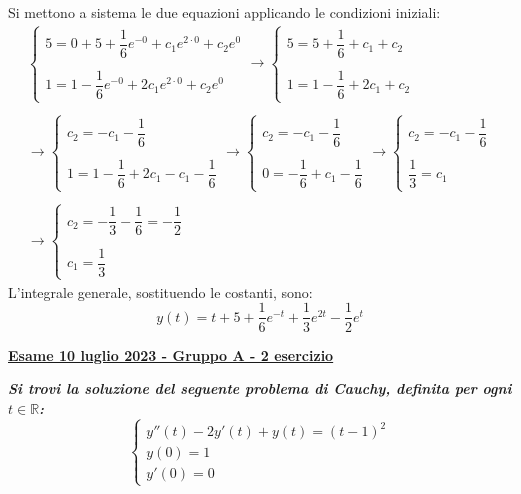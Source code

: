 \documentclass[a4paper]{article}
\newcommand{\definition}[1]{\textcolor{Red3}{\textbf{#1}}}
\newcommand{\example}[1]{\textcolor{Green4}{\textbf{#1}}}
\begin{document}
	Si mettono a sistema le due equazioni applicando le condizioni iniziali:
	\begin{gather*}
		\begin{cases}
			5 = 0 + 5 + \dfrac{1}{6}e^{-0} + c_{1}e^{2 \cdot 0} + c_{2}e^{0} \\ \\
			1 = 1 - \dfrac{1}{6}e^{-0} + 2c_{1}e^{2 \cdot 0} + c_{2}e^{0}
		\end{cases} \rightarrow
		\begin{cases}
			5 = 5 + \dfrac{1}{6} + c_{1} + c_{2} \\ \\
			1 = 1 - \dfrac{1}{6} + 2c_{1} + c_{2}
		\end{cases} \\ \\
		\rightarrow \begin{cases}
			c_{2} = -c_{1} -\dfrac{1}{6} \\ \\
			1 = 1 - \dfrac{1}{6} + 2c_{1} -c_{1} -\dfrac{1}{6}
		\end{cases} \rightarrow
		\begin{cases}
			c_{2} = -c_{1} -\dfrac{1}{6} \\ \\
			0 = - \dfrac{1}{6} + c_{1} - \dfrac{1}{6}
		\end{cases} \rightarrow
		\begin{cases}
			c_{2} = -c_{1} -\dfrac{1}{6} \\ \\
			\dfrac{1}{3} = c_{1}
		\end{cases} \\ \\
		\rightarrow
		\begin{cases}
			c_{2} = -\dfrac{1}{3} - \dfrac{1}{6} = -\dfrac{1}{2} \\ \\
			c_{1} = \dfrac{1}{3}
		\end{cases}
	\end{gather*}
	L'integrale generale, sostituendo le costanti, sono:
	\begin{equation*}
		y\left(t\right) = t + 5 + \dfrac{1}{6}e^{-t} + \dfrac{1}{3}e^{2t} - \dfrac{1}{2}e^{t}
	\end{equation*}\newpage

	\begin{flushleft}
		\label{exam: esame 10 luglio 2023 - Gruppo A - 2 esercizio}
		\hypertarget{
			exam: esame 10 luglio 2023 - Gruppo A - 2 esercizio
		}{
			\definition{\underline{Esame 10 luglio 2023 - Gruppo A - 2 esercizio}}
		}
	\end{flushleft}
	\example{\emph{Si trovi la soluzione del seguente problema di Cauchy, definita per ogni $t \in \mathbb{R}$:}
	\begin{equation*}
		\begin{cases}
			y''\left(t\right) - 2y'\left(t\right) + y\left(t\right) = \left(t-1\right)^{2} \\
			y\left(0\right) = 1 \\
			y'\left(0\right) = 0
		\end{cases}
	\end{equation*}}
\end{document}
